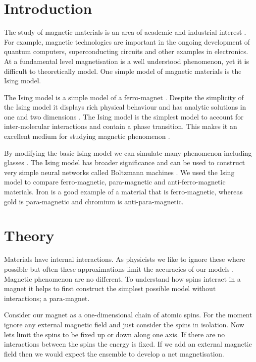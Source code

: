 \documentclass[a4paper, twocolumn]{article}
\begin{document}
\clearpage
\section*{Introduction}
The study of magnetic materials is an area of academic %
and industrial interest \cite{Shroeder2021}. For example, magnetic %
technologies are important in the ongoing development of %
quantum computers, superconducting circuits and other %
examples in electronics. At a fundamental level %
magnetisation is a well understood phenomenon, yet it is %
difficult to theoretically model. One simple model of magnetic %
materials is the Ising model. 


The Ising model is a simple model of a ferro-magnet \cite{MacKay2003}. %
Despite the simplicity of the Ising model it displays rich %
physical behaviour and has analytic solutions in one and %
two dimensions \cite{MacKay2003, Schroeder2021}. The Ising model is the %
simplest model to account for inter-molecular interactions and contain a phase %
transition. This makes it an excellent medium for studying %
magnetic phenomenon \cite{MacKay2003}. 


By modifying the basic Ising model we can simulate many %
phenomenon including glasses \cite{McMillan1984}. The Ising model %
has broader significance and can be used to construct very %
simple neural networks called Boltzmann machines \cite{MacKay2003}. We %
used the Ising model to compare ferro-magnetic, para-magnetic and %
anti-ferro-magnetic materials. Iron is a good example of a material %
that is ferro-magnetic, whereas gold is para-magnetic and chromium %
is anti-para-magnetic. 


\section*{Theory}
Materials have internal interactions. As physicists we like %
to ignore these where possible but often these approximations %
limit the accuracies of our models \cite{Schroeder2021, Kittel1969}. Magnetic %
phenomenon are no different. To understand how spins interact %
in a magnet it helps to first construct the simplest possible %
model without interactions; a para-magnet.


Consider our magnet as a one-dimensional chain of atomic spins. %
For the moment ignore any external magnetic field and just %
consider the spins in isolation. Now lets limit the spins to %
be fixed up or down along one axis. If there are no interactions %
between the spins the energy is fixed. If we add an external %
magnetic field then we would expect the ensemble to develop a %
net magnetisation.
\end{document}

